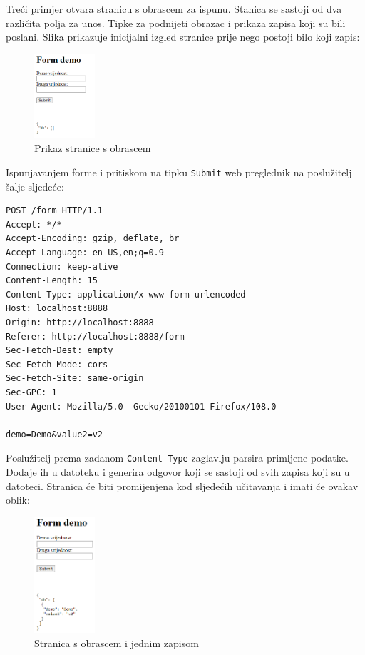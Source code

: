 \documentclass[]{foi}
\begin{document}
Treći primjer otvara stranicu s obrascem za ispunu. Stanica se sastoji od dva različita
polja za unos. Tipke za podnijeti obrazac i prikaza zapisa koji su bili poslani. Slika
prikazuje inicijalni izgled stranice prije nego postoji bilo koji zapis:
\begin{figure}[h!]
	\centering
	\includegraphics[width=0.2\textwidth]{slike/form.png}
	\caption{Prikaz stranice s obrascem}
	\label{fig:form}
\end{figure}

Ispunjavanjem forme i pritiskom na tipku \texttt{Submit} web preglednik na poslužitelj
šalje sljedeće:
\begin{verbatim}
POST /form HTTP/1.1
Accept: */*
Accept-Encoding: gzip, deflate, br
Accept-Language: en-US,en;q=0.9
Connection: keep-alive
Content-Length: 15
Content-Type: application/x-www-form-urlencoded
Host: localhost:8888
Origin: http://localhost:8888
Referer: http://localhost:8888/form
Sec-Fetch-Dest: empty
Sec-Fetch-Mode: cors
Sec-Fetch-Site: same-origin
Sec-GPC: 1
User-Agent: Mozilla/5.0  Gecko/20100101 Firefox/108.0

demo=Demo&value2=v2
\end{verbatim}
Poslužitelj prema zadanom \texttt{Content-Type} zaglavlju parsira
primljene podatke. Dodaje ih u datoteku i generira odgovor koji se sastoji
od svih zapisa koji su u datoteci. Stranica će biti promijenjena kod sljedećih
učitavanja i imati će ovakav oblik:
\begin{figure}[h]
	\centering
	\includegraphics[width=0.2\textwidth]{slike/form2.png}
	\caption{Stranica s obrascem i jednim zapisom}
	\label{fig:form2}
\end{figure}
\end{document}
